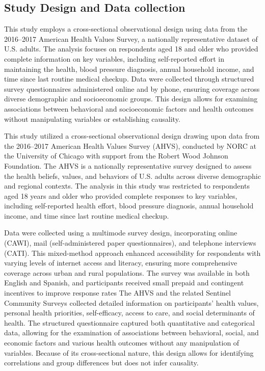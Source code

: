 \documentclass[
  letterpaper,
  DIV=11,
  numbers=noendperiod]{scrartcl}
\begin{document}
\subsection{Study Design and Data collection}\label{sec-design}

This study employs a cross-sectional observational design using data
from the 2016--2017 American Health Values Survey, a nationally
representative dataset of U.S. adults. The analysis focuses on
respondents aged 18 and older who provided complete information on key
variables, including self-reported effort in maintaining the health,
blood pressure diagnosis, annual household income, and time since last
routine medical checkup. Data were collected through structured survey
questionnaires administered online and by phone, ensuring coverage
across diverse demographic and socioeconomic groups. This design allows
for examining associations between behavioral and socioeconomic factors
and health outcomes without manipulating variables or establishing
causality.

This study utilized a cross-sectional observational design drawing upon
data from the 2016--2017 American Health Values Survey (AHVS), conducted
by NORC at the University of Chicago with support from the Robert Wood
Johnson Foundation. The AHVS is a nationally representative survey
designed to assess the health beliefs, values, and behaviors of U.S.
adults across diverse demographic and regional contexts. The analysis in
this study was restricted to respondents aged 18 years and older who
provided complete responses to key variables, including self-reported
health effort, blood pressure diagnosis, annual household income, and
time since last routine medical checkup.

Data were collected using a multimode survey design, incorporating
online (CAWI), mail (self-administered paper questionnaires), and
telephone interviews (CATI). This mixed-method approach enhanced
accessibility for respondents with varying levels of internet access and
literacy, ensuring more comprehensive coverage across urban and rural
populations. The survey was available in both English and Spanish, and
participants received small prepaid and contingent incentives to improve
response rates The AHVS and the related Sentinel Community Surveys
collected detailed information on participants' health values, personal
health priorities, self-efficacy, access to care, and social
determinants of health. The structured questionnaire captured both
quantitative and categorical data, allowing for the examination of
associations between behavioral, social, and economic factors and
various health outcomes without any manipulation of variables. Because
of its cross-sectional nature, this design allows for identifying
correlations and group differences but does not infer causality.
\end{document}
